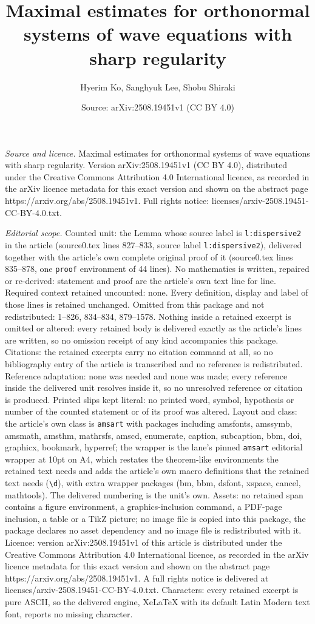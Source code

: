 \documentclass[10pt,a4paper]{amsart}
\title[Maximal estimates for orthonormal systems of wave equations ]{Maximal estimates for orthonormal systems of wave equations with sharp regularity}
\author{Hyerim Ko, Sanghyuk Lee, Shobu Shiraki}
\date{Source: arXiv:2508.19451v1 (CC BY 4.0)}
\begin{document}
\maketitle

\noindent\emph{Source and licence.} Maximal estimates for orthonormal systems of wave equations with sharp regularity. Version arXiv:2508.19451v1 (CC BY 4.0), distributed under the Creative Commons Attribution 4.0 International licence, as recorded in the arXiv licence metadata for this exact version and shown on the abstract page https://arxiv.org/abs/2508.19451v1. Full rights notice: licenses/arxiv-2508.19451-CC-BY-4.0.txt.\par\smallskip

\noindent\textit{Editorial scope.} Counted unit: the Lemma whose source label is \texttt{l:dispersive2} in the article (source0.tex lines 827--833, source label \texttt{l:dispersive2}), delivered together with the article's own complete original proof of it (source0.tex lines 835--878, one \texttt{proof} environment of 44 lines). No mathematics is written, repaired or re-derived: statement and proof are the article's own text line for line. Required context retained uncounted: none. Every definition, display and label of those lines is retained unchanged. Omitted from this package and not redistributed: 1--826, 834--834, 879--1578. Nothing inside a retained excerpt is omitted or altered: every retained body is delivered exactly as the article's lines are written, so no omission receipt of any kind accompanies this package. Citations: the retained excerpts carry no citation command at all, so no bibliography entry of the article is transcribed and no reference is redistributed. Reference adaptation: none was needed and none was made; every reference inside the delivered unit resolves inside it, so no unresolved reference or citation is produced. Printed slips kept literal: no printed word, symbol, hypothesis or number of the counted statement or of its proof was altered. Layout and class: the article's own class is \texttt{amsart} with packages including amsfonts, amssymb, amsmath, amsthm, mathrsfs, amscd, enumerate, caption, subcaption, bbm, doi, graphicx, bookmark, hyperref; the wrapper is the lane's pinned \texttt{amsart} editorial wrapper at 10pt on A4, which restates the theorem-like environments the retained text needs and adds the article's own macro definitions that the retained text needs (\texttt{\textbackslash d}), with extra wrapper packages (bm, bbm, dsfont, xspace, cancel, mathtools). The delivered numbering is the unit's own. Assets: no retained span contains a figure environment, a graphics-inclusion command, a PDF-page inclusion, a table or a TikZ picture; no image file is copied into this package, the package declares no asset dependency and no image file is redistributed with it. Licence: version arXiv:2508.19451v1 of this article is distributed under the Creative Commons Attribution 4.0 International licence, as recorded in the arXiv licence metadata for this exact version and shown on the abstract page https://arxiv.org/abs/2508.19451v1. A full rights notice is delivered at licenses/arxiv-2508.19451-CC-BY-4.0.txt. Characters: every retained excerpt is pure ASCII, so the delivered engine, XeLaTeX with its default Latin Modern text font, reports no missing character.
\end{document}
